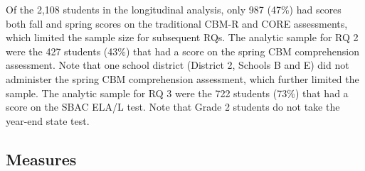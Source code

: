\documentclass[
  english,
  man, fleqn, noextraspace]{apa6}
\begin{document}
Of the 2,108 students in the longitudinal analysis, only 987 (47\%) had scores both fall and spring scores on the traditional CBM-R and CORE assessments, which limited the sample size for subsequent RQs. The analytic sample for RQ 2 were the 427 students (43\%) that had a score on the spring CBM comprehension assessment. Note that one school district (District 2, Schools B and E) did not administer the spring CBM comprehension assessment, which further limited the sample. The analytic sample for RQ 3 were the 722 students (73\%) that had a score on the SBAC ELA/L test. Note that Grade 2 students do not take the year-end state test.

\hypertarget{measures}{%
\subsection{Measures}\label{measures}}
\end{document}

